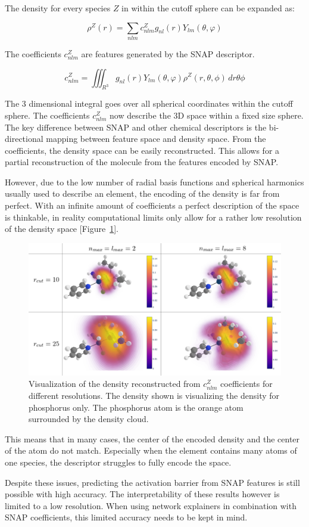 The density for every species $Z$ in within the cutoff sphere can be expanded as:

$$ \rho^Z(r) = \sum_{nlm} c^Z_{nlm} g_{nl}(r) Y_{lm}(\theta, \varphi) $$

The coefficients $c_{nlm}^Z$ are features generated by the SNAP descriptor.

$$ c_{nlm}^Z = \iiint_{R^3} g_{nl}(r) Y_{lm}(\theta, \varphi) \rho^Z(r, \theta, \phi)  \,dr\theta\phi   $$

The 3 dimensional integral goes over all spherical coordinates within the cutoff sphere.
The coefficients $c^Z_{nlm}$ now describe the 3D space within a fixed size sphere.
\\
The key difference between SNAP and other chemical descriptors is the bi-directional mapping between feature space and 
density space.
From the coefficients, the density space can be easily reconstructed.
This allows for a partial reconstruction of the molecule from the features encoded by SNAP.

However, due to the low number of radial basis functions and spherical harmonics usually used to describe an element, 
the encoding of the density is far from perfect.
With an infinite amount of coefficients a perfect description of the space is thinkable,
in reality computational limits only allow for a rather low resolution of the density space [Figure~\ref{fig:snap-density}]. 
\begin{figure} [h]
  \centering
  \includegraphics[width=1\textwidth]{figures/snap/density/Densities.png} %
  \caption[SNAP density visualization]{Visualization of the density reconstructed from $c_{nlm}^Z$ coefficients for different resolutions.
  The density shown is visualizing the density for phosphorus only.
  The phosphorus atom is the orange atom surrounded by the density cloud.
  }
  \label{fig:snap-density}
\end{figure}

This means that in many cases, the center of the encoded density and the center of the atom do not match.
Especially when the element contains many atoms of one species, the descriptor struggles to fully encode the space.

Despite these issues, predicting the activation barrier from SNAP features is still possible with high accuracy.
The interpretability of these results however is limited to a low resolution.
When using network explainers in combination with SNAP coefficients, this limited accuracy needs to be kept in mind.
